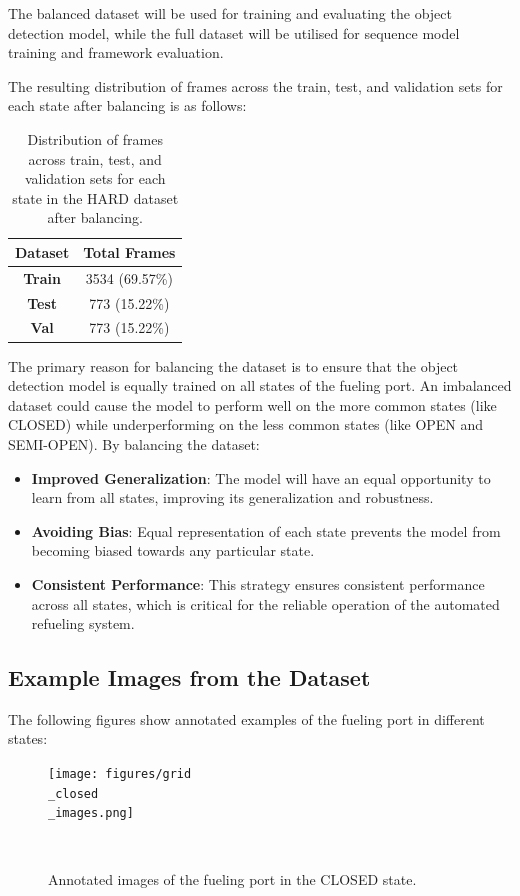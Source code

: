 \documentclass[12pt,oneside]{book} %
\begin{document}
The balanced dataset will be used for training and evaluating the object
detection model, while the full dataset will be utilised for sequence model
training and framework evaluation.

The resulting distribution of frames across the train, test, and validation
sets for each state after balancing is as follows:
\begin{table}[H]
    \centering
    \begin{tabular}{@{}cc@{}}
        \toprule
        \textbf{Dataset} & \textbf{Total Frames} \\ \midrule
        \textbf{Train}   & 3534 (69.57\%)        \\ 
        \textbf{Test}    & 773  (15.22\%)        \\ 
        \textbf{Val}     & 773  (15.22\%)        \\ \bottomrule
    \end{tabular}
    \caption{\centering Distribution of frames across train, test, and validation sets for each state in the HARD dataset after balancing.}
    \label{tab:balanced_frame_distribution}
\end{table}

The primary reason for balancing the dataset is to ensure that the object
detection model is equally trained on all states of the fueling port. An
imbalanced dataset could cause the model to perform well on the more common
states (like CLOSED) while underperforming on the less common states (like OPEN
and SEMI-OPEN). By balancing the dataset:

\begin{itemize}
    \item \textbf{Improved Generalization}: The model will have an equal opportunity to learn from all states, improving its generalization and robustness.
    \item \textbf{Avoiding Bias}: Equal representation of each state prevents the model from becoming biased towards any particular state.
    \item \textbf{Consistent Performance}: This strategy ensures consistent performance across all states, which is critical for the reliable operation of the automated refueling system.
\end{itemize}

\subsection{Example Images from the Dataset}
The following figures show annotated examples of the fueling port in different
states:
\begin{figure}[H]
    \centering
    \texttt{[image: figures/grid\\\_closed\\\_images.png]}
    \caption{Annotated images of the fueling port in the CLOSED state.}~\label{fig:grid-closed-images}
\end{figure}
\end{document}
